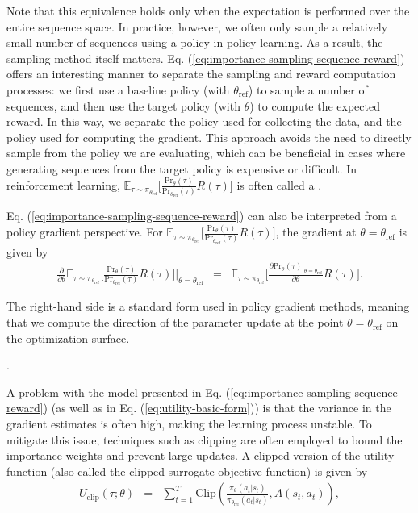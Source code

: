 {Note that this equivalence holds only when the expectation is performed over the entire sequence space. In practice, however, we often only sample a relatively small number of sequences using a policy in policy learning. As a result, the sampling method itself matters. Eq. (\ref{eq:importance-sampling-sequence-reward}) offers an interesting manner to separate the sampling and reward computation processes: we first use a baseline policy (with $\theta_{\mathrm{ref}}$) to sample a number of sequences, and then use the target policy (with $\theta$) to compute the expected reward. In this way, we separate the policy used for collecting the data, and the policy used for computing the gradient. This approach avoids the need to directly sample from the policy we are evaluating, which can be beneficial in cases where generating sequences from the target policy is expensive or difficult. In reinforcement learning, $\mathbb{E}_{\tau \sim \pi_{\theta_{\mathrm{ref}}}} \Big[ \frac{\mathrm{Pr}_{\theta}(\tau)}{\mathrm{Pr}_{\theta_{\mathrm{ref}}}(\tau)} R(\tau) \Big]$ is often called a .

Eq. (\ref{eq:importance-sampling-sequence-reward}) can also be interpreted from a policy gradient perspective. For $\mathbb{E}_{\tau \sim \pi_{\theta_{\mathrm{ref}}}} \Big[ \frac{\mathrm{Pr}_{\theta}(\tau)}{\mathrm{Pr}_{\theta_{\mathrm{ref}}}(\tau)} R(\tau) \Big]$, the gradient at $\theta=\theta_{\mathrm{ref}}$ is given by
\begin{eqnarray}
\frac{\partial}{\partial \theta} \mathbb{E}_{\tau \sim \pi_{\theta_{\mathrm{ref}}}} \Big[ \frac{\mathrm{Pr}_{\theta}(\tau)}{\mathrm{Pr}_{\theta_{\mathrm{ref}}}(\tau)} R(\tau) \Big] \Big |_{\theta = \theta_{\mathrm{ref}}} & = & \mathbb{E}_{\tau \sim \pi_{\theta_{\mathrm{ref}}}} \Big[ \frac{\partial \mathrm{Pr}_{\theta}(\tau) |_{\theta = \theta_{\mathrm{ref}}}}{\partial \theta} R(\tau) \Big].
\end{eqnarray}

The right-hand side is a standard form used in policy gradient methods, meaning that we compute the direction of the parameter update at the point $\theta=\theta_{\mathrm{ref}}$ on the optimization surface.
}.

A problem with the model presented in Eq. (\ref{eq:importance-sampling-sequence-reward}) (as well as in Eq. (\ref{eq:utility-basic-form})) is that the variance in the gradient estimates is often high, making the learning process unstable. To mitigate this issue, techniques such as clipping are often employed to bound the importance weights and prevent large updates. A clipped version of the utility function (also called the clipped surrogate objective function) is given by
\begin{eqnarray}
U_{\mathrm{clip}}(\tau;\theta) & = & \sum_{t=1}^{T} \mathrm{Clip}\left( \frac{\pi_{\theta}(a_t|s_t)}{\pi_{\theta_{\mathrm{ref}}}(a_t|s_t)}, A(s_t,a_t) \right),
\end{eqnarray}

